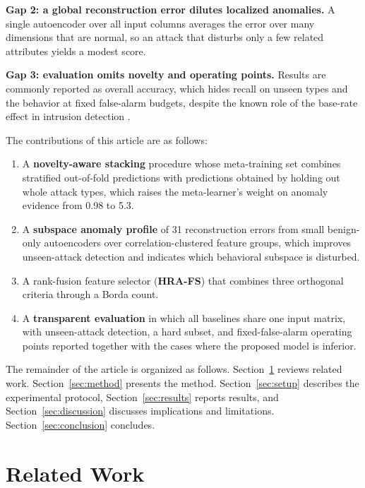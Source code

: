 \documentclass[journal]{IEEEtran}
\begin{document}
\textbf{Gap 2: a global reconstruction error dilutes localized anomalies.} A single autoencoder over all input columns averages the error over many dimensions that are normal, so an attack that disturbs only a few related attributes yields a modest score.

\textbf{Gap 3: evaluation omits novelty and operating points.} Results are commonly reported as overall accuracy, which hides recall on unseen types and the behavior at fixed false-alarm budgets, despite the known role of the base-rate effect in intrusion detection \cite{axelsson2000}.

The contributions of this article are as follows:
\begin{enumerate}
\item A \textbf{novelty-aware stacking} procedure whose meta-training set combines stratified out-of-fold predictions with predictions obtained by holding out whole attack types, which raises the meta-learner's weight on anomaly evidence from 0.98 to 5.3.
\item A \textbf{subspace anomaly profile} of 31 reconstruction errors from small benign-only autoencoders over correlation-clustered feature groups, which improves unseen-attack detection and indicates which behavioral subspace is disturbed.
\item A rank-fusion feature selector (\textbf{HRA-FS}) that combines three orthogonal criteria through a Borda count.
\item A \textbf{transparent evaluation} in which all baselines share one input matrix, with unseen-attack detection, a hard subset, and fixed-false-alarm operating points reported together with the cases where the proposed model is inferior.
\end{enumerate}

The remainder of the article is organized as follows. Section~\ref{sec:related} reviews related work. Section~\ref{sec:method} presents the method. Section~\ref{sec:setup} describes the experimental protocol, Section~\ref{sec:results} reports results, and Section~\ref{sec:discussion} discusses implications and limitations. Section~\ref{sec:conclusion} concludes.

\section{Related Work}
\label{sec:related}
\end{document}
